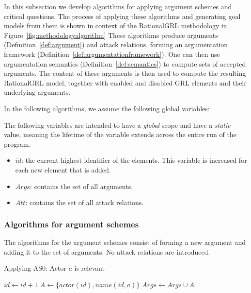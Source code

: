 In this subsection we develop algorithms for applying argument schemes and critical questions. The process of applying these algorithms and generating goal models from them is shown in context of the RationalGRL methodology in Figure~\ref{fig:methodologyalgorithm}  These algorithms produce arguments (Definition~\ref{def:argument}) and attack relations, forming an argumentation framework (Definition~\ref{def:argumentationframework}). One can then use argumentation semantics (Definition~\ref{def:semantics}) to compute sets of accepted arguments. The content of these arguments is then used to compute the resulting RationalGRL model, together with enabled and disabled GRL elements and their underlying arguments.

In the following algorithms, we assume the following global variables:

\begin{definition} The following variables are intended to have a \emph{global} scope and have a \emph{static} value, meaning the lifetime of the variable extends across the entire run of the program.
\begin{itemize}
\item $id$: the current highest identifier of the elements. This variable is increased for each new element that is added.
\item $Args$: contains the set of all arguments.
\item $Att$: contains the set of all attack relations.
\end{itemize}
\end{definition}


\subsubsection*{Algorithms for argument schemes}
The algorithms for the argument schemes consist of forming a new argument and adding it to the set of arguments. No attack relations are introduced.

\begin{algorithm}[h]
  \caption{Applying AS0: Actor $a$ is relevant}\label{alg:as0}
  \begin{algorithmic}[1]
    \State $id\gets id+1$\label{alg:as0:1}
    \State $A \gets \{actor(id), name(id,a)\}$\label{alg:as0:2}
    \State $Args \gets Args \cup A$\label{alg:as0:3}
    \EndProcedure
  \end{algorithmic}
\end{algorithm}

